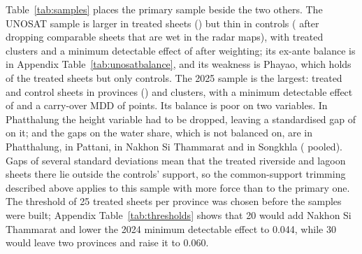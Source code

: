 \begin{table}[t]
\centering\footnotesize
\caption{The three registered samples}\label{tab:samples}

\end{table}

Table~\ref{tab:samples} places the primary sample beside the two others. The UNOSAT sample is larger in treated sheets (\unoTreatedReg) but thin in controls (\unoControls{} after dropping \unoRadarWet{} comparable sheets that are wet in the radar maps), with \unoTreatedClusters{} treated clusters and a minimum detectable effect of \unoMdeW{} after weighting; its ex-ante balance is in Appendix Table~\ref{tab:unosatbalance}, and its weakness is Phayao, which holds \unoPhayaoTreated{} of the treated sheets but only \unoPhayaoControls{} controls. The 2025 sample is the largest: \evTreated{} treated and \evControls{} control sheets in \evProvinces{} provinces (\evProvinceList) and \evClusters{} clusters, with a minimum detectable effect of \evMdeW{} and a carry-over MDD of \evCarry{} points. Its balance is poor on two variables. In Phatthalung the height variable had to be dropped, leaving a standardised gap of \evPhatthalungGapHeight{} on it; and the gaps on the water share, which is not balanced on, are \evPhatthalungGapWater{} in Phatthalung, \evPattaniGapWater{} in Pattani, \evNakhonSiGapWater{} in Nakhon Si Thammarat and \evSongkhlaGapWater{} in Songkhla (\evGapWater{} pooled). Gaps of several standard deviations mean that the treated riverside and lagoon sheets there lie outside the controls' support, so the common-support trimming described above applies to this sample with more force than to the primary one. The threshold of 25 treated sheets per province was chosen before the samples were built; Appendix Table~\ref{tab:thresholds} shows that 20 would add Nakhon Si Thammarat and lower the 2024 minimum detectable effect to 0.044, while 30 would leave two provinces and raise it to 0.060.

